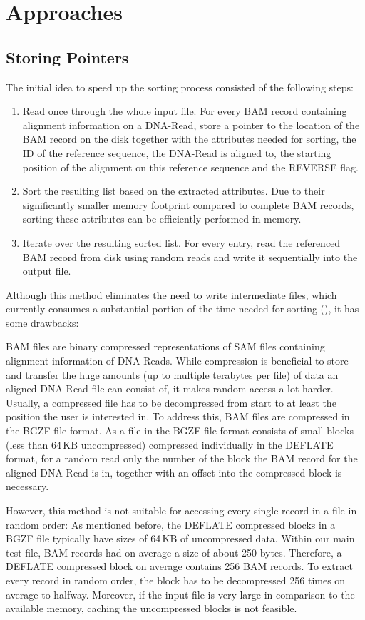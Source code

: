 \section{Approaches}
\subsection{Storing Pointers}
The initial idea to speed up the sorting process consisted of the following steps: 
\begin{enumerate}
    \item Read once through the whole input file. For every BAM record containing alignment information on a DNA-Read, store a pointer to the location of the BAM record on the disk together with the attributes needed for sorting, the ID of the reference sequence, the DNA-Read is aligned to, the starting position of the alignment on this reference sequence and the REVERSE flag.
    \item Sort the resulting list based on the extracted attributes. Due to their significantly smaller memory footprint compared to complete BAM records, sorting these attributes can be efficiently performed in-memory.
    \item Iterate over the resulting sorted list. For every entry, read the referenced BAM record from disk using random reads and write it sequentially into the output file.
\end{enumerate}

Although this method eliminates the need to write intermediate files, which currently consumes a substantial portion of the time needed for sorting (), it has some drawbacks: 

BAM files are binary compressed representations of SAM files containing alignment information of DNA-Reads. While compression is beneficial to store and transfer the huge amounts (up to multiple terabytes per file) of data an aligned DNA-Read file can consist of, it makes random access a lot harder. Usually, a compressed file has to be decompressed from start to at least the position the user is interested in. To address this, BAM files are compressed in the BGZF file format. As a file in the BGZF file format consists of small blocks (less than 64\,KB uncompressed) compressed individually in the  DEFLATE format, for a random read only the number of the block the BAM record for the aligned DNA-Read is in, together with an offset into the compressed block is necessary. 

However, this method is not suitable for accessing every single record in a file in random order:
As mentioned before, the DEFLATE compressed blocks in a BGZF file typically have sizes of 64\,KB of uncompressed data. Within our main test file, BAM records had on average a size of about 250 bytes. Therefore, a DEFLATE compressed block on average contains 256 BAM records. To extract every record in random order, the block has to be decompressed 256 times on average to halfway. Moreover, if the input file is very large in comparison to the available memory, caching  the uncompressed blocks is not feasible. 

